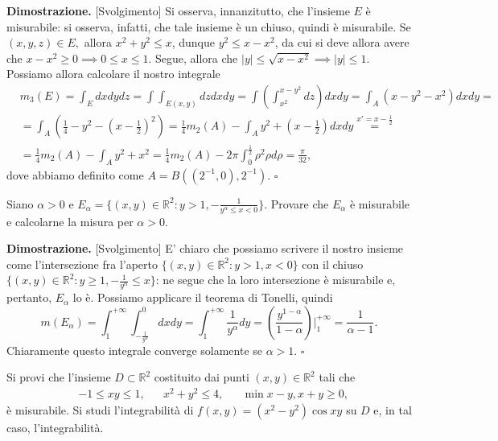 \noindent \textbf{Dimostrazione. } [Svolgimento]
	Si osserva, innanzitutto, che l'insieme $E$ è misurabile: si osserva, infatti, che tale insieme è un chiuso, quindi è misurabile. Se $(x, y, z) \in E,$ allora $x^2 + y^2 \leq x$, dunque $y^2 \leq x - x^2$, da cui si deve allora avere che $x - x^2 \geq 0 \implies 0 \leq x \leq 1$. Segue, allora che $|y| \leq \sqrt{x - x^2} \implies |y| \leq 1$.
	Possiamo allora calcolare il nostro integrale
	\[\begin{aligned}
	&m_3(E) = \int_E dxdydz = \int \int_{E(x, y)} dz dxdy = \int (\int_{x^2}^{x-y^2} dz)dxdy = \int_A (x - y^2 - x^2) dxdy = \\
	&=\int_A (\frac{1}{4} - y^2 - (x - \frac{1}{2})^2) =\frac{1}{4}m_2(A) - \int_A y^2 + (x-\frac{1}{2})dxdy \stackrel{x' = x-\frac{1}{2}}{=} \\
	&=\frac{1}{4} m_2(A) - \int_A y^2 + x^2 = \frac{1}{4} m_2(A) - 2 \pi \int_0^{\frac{1}{2}} \rho^2 \rho d\rho = \frac{\pi}{32},
	\end{aligned}\]
	dove abbiamo definito come $A = B((2^{-1}, 0), 2^{-1})$.
\hfill $\square$
%
\vspace{0.5cm}
\begin{exercise}
	Siano $\alpha > 0$ e $E_\alpha = \{ (x, y) \in \mathbb{R}^2 : y>1, - \frac{1}{y^{\alpha} \leq x < 0 }\}$. Provare che $E_\alpha$ è misurabile e calcolarne la misura per $\alpha > 0$.
\end{exercise}
%
\noindent \textbf{Dimostrazione. } [Svolgimento]
	E' chiaro che possiamo scrivere il nostro insieme come l'intersezione fra l'aperto $\{(x, y) \in \mathbb{R}^2: y > 1, x < 0 \}$ con il chiuso $\{ (x, y) \in \mathbb{R}^2 : y \geq 1, - \frac{1}{y^\alpha} \leq x \}$: ne segue che la loro intersezione è misurabile e, pertanto, $E_\alpha$ lo è. Possiamo applicare il teorema di Tonelli, quindi
	$$
		m(E_\alpha) = \int_1^{+\infty} \int_{-\frac{1}{y^{\alpha}}}^{0} dxdy = \int_1^{+\infty} \frac{1}{y^{\alpha}} dy = (\frac{y^{1-\alpha}}{1-\alpha})|^{+\infty}_1 = \frac{1}{\alpha - 1}. 
	$$
	Chiaramente questo integrale converge solamente se $\alpha > 1$.
\hfill $\square$
%
\vspace{0.5cm}
\begin{exercise}
	Si provi che l'insieme $D \subset \mathbb{R}^2$ costituito dai punti $(x, y) \in \mathbb{R}^2$ tali che
	\[\begin{aligned}
	&-1 \leq xy \leq 1, & &x^2 + y^2 \leq 4, & &\min{x-y, x+y} \geq 0,  
	\end{aligned}\]
	è misurabile. Si studi l'integrabilità di $f(x, y) = (x^2 - y^2)\cos{xy}$ su $D$ e, in tal caso, l'integrabilità.
\end{exercise}
